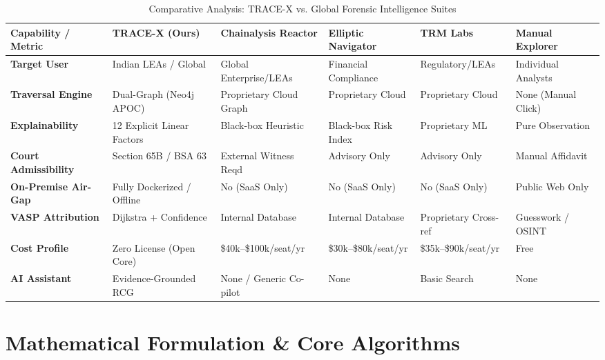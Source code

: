 \documentclass[10pt,twocolumn,a4paper]{article}
\begin{document}
\begin{table}[t]
\centering
\small
\caption{Comparative Analysis: TRACE-X vs. Global Forensic Intelligence Suites}
\label{tab:comparison}
\begin{tabularx}{\textwidth}{lXXXXX}
\toprule
\textbf{Capability / Metric} & \textbf{TRACE-X (Ours)} & \textbf{Chainalysis Reactor} & \textbf{Elliptic Navigator} & \textbf{TRM Labs} & \textbf{Manual Explorer} \\
\midrule
\textbf{Target User} & Indian LEAs / Global & Global Enterprise/LEAs & Financial Compliance & Regulatory/LEAs & Individual Analysts \\
\textbf{Traversal Engine} & Dual-Graph (Neo4j APOC) & Proprietary Cloud Graph & Proprietary Cloud & Proprietary Cloud & None (Manual Click) \\
\textbf{Explainability} & 12 Explicit Linear Factors & Black-box Heuristic & Black-box Risk Index & Proprietary ML & Pure Observation \\
\textbf{Court Admissibility} & Section 65B / BSA 63 & External Witness Reqd & Advisory Only & Advisory Only & Manual Affidavit \\
\textbf{On-Premise Air-Gap} & Fully Dockerized / Offline & No (SaaS Only) & No (SaaS Only) & No (SaaS Only) & Public Web Only \\
\textbf{VASP Attribution} & Dijkstra + Confidence & Internal Database & Internal Database & Proprietary Cross-ref & Guesswork / OSINT \\
\textbf{Cost Profile} & Zero License (Open Core) & \$40k--\$100k/seat/yr & \$30k--\$80k/seat/yr & \$35k--\$90k/seat/yr & Free \\
\textbf{AI Assistant} & Evidence-Grounded RCG & None / Generic Co-pilot & None & Basic Search & None \\
\bottomrule
\end{tabularx}
\end{table}

\section{Mathematical Formulation \& Core Algorithms}
\end{document}
